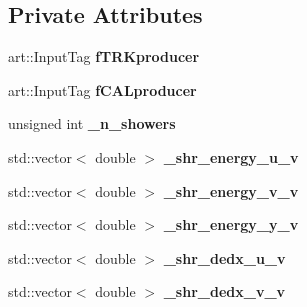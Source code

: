 \subsection*{Private Attributes}
\begin{DoxyCompactItemize}
\item 
\hypertarget{classanalysis_1_1ShowerAnalysis_aaf85b896fee0cd1a3f089e14c48d6849}{art\-::\-Input\-Tag {\bfseries f\-T\-R\-Kproducer}}\label{classanalysis_1_1ShowerAnalysis_aaf85b896fee0cd1a3f089e14c48d6849}

\item 
\hypertarget{classanalysis_1_1ShowerAnalysis_afc78776f278428b5919f03dc97d71789}{art\-::\-Input\-Tag {\bfseries f\-C\-A\-Lproducer}}\label{classanalysis_1_1ShowerAnalysis_afc78776f278428b5919f03dc97d71789}

\item 
\hypertarget{classanalysis_1_1ShowerAnalysis_a421f0c13019ec5da2784f611b43cfe2d}{unsigned int {\bfseries \-\_\-n\-\_\-showers}}\label{classanalysis_1_1ShowerAnalysis_a421f0c13019ec5da2784f611b43cfe2d}

\item 
\hypertarget{classanalysis_1_1ShowerAnalysis_ade84262e802b7aa45c8745cc7be69fd1}{std\-::vector$<$ double $>$ {\bfseries \-\_\-shr\-\_\-energy\-\_\-u\-\_\-v}}\label{classanalysis_1_1ShowerAnalysis_ade84262e802b7aa45c8745cc7be69fd1}

\item 
\hypertarget{classanalysis_1_1ShowerAnalysis_a38a0debe51fc30481458de0cbf00272d}{std\-::vector$<$ double $>$ {\bfseries \-\_\-shr\-\_\-energy\-\_\-v\-\_\-v}}\label{classanalysis_1_1ShowerAnalysis_a38a0debe51fc30481458de0cbf00272d}

\item 
\hypertarget{classanalysis_1_1ShowerAnalysis_ada81e99cc9d01b13ee0a93c593468d6f}{std\-::vector$<$ double $>$ {\bfseries \-\_\-shr\-\_\-energy\-\_\-y\-\_\-v}}\label{classanalysis_1_1ShowerAnalysis_ada81e99cc9d01b13ee0a93c593468d6f}

\item 
\hypertarget{classanalysis_1_1ShowerAnalysis_ab64b3e69b214ab3630995a5d6bf3a379}{std\-::vector$<$ double $>$ {\bfseries \-\_\-shr\-\_\-dedx\-\_\-u\-\_\-v}}\label{classanalysis_1_1ShowerAnalysis_ab64b3e69b214ab3630995a5d6bf3a379}

\item 
\hypertarget{classanalysis_1_1ShowerAnalysis_ad212e61eceac2d645e406eda4954533c}{std\-::vector$<$ double $>$ {\bfseries \-\_\-shr\-\_\-dedx\-\_\-v\-\_\-v}}\label{classanalysis_1_1ShowerAnalysis_ad212e61eceac2d645e406eda4954533c}


\end{DoxyCompactItemize}
